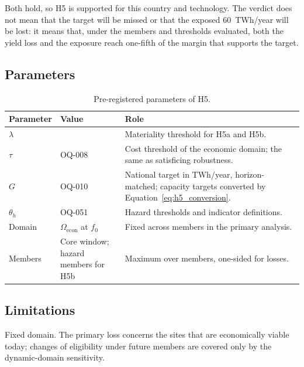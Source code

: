 Both hold, so H5 is supported for this country and technology. The verdict does
not mean that the target will be missed or that the exposed 60~TWh/year will be
lost: it means that, under the members and thresholds evaluated, both the yield
loss and the exposure reach one-fifth of the margin that supports the target.

\subsection{Parameters}
\label{subsec:h5_parameters}

\begin{table}[htbp]
    \centering
    \caption{Pre-registered parameters of H5.}
    \label{tab:h5_parameters}
    \small
    \renewcommand{\arraystretch}{1.2}
    \begin{tabularx}{\textwidth}{
        @{}
        >{\raggedright\arraybackslash}p{2.4cm}
        >{\raggedright\arraybackslash}p{3.2cm}
        >{\raggedright\arraybackslash}X
        @{}
    }
        \toprule
        \textbf{Parameter} & \textbf{Value} & \textbf{Role} \\
        \midrule
        $\lambda$ & 0.20 & Materiality threshold for H5a and H5b. \\
        \addlinespace
        $\tau$ & OQ-008 & Cost threshold of the economic domain; the same as
        satisficing robustness. \\
        \addlinespace
        $G$ & OQ-010 & National target in TWh/year, horizon-matched; capacity
        targets converted by Equation~\ref{eq:h5_conversion}. \\
        \addlinespace
        $\theta_h$ & OQ-051 & Hazard thresholds and indicator definitions. \\
        \addlinespace
        Domain & $\Omega_{\mathrm{econ}}$ at $f_0$ & Fixed across members in the
        primary analysis. \\
        \addlinespace
        Members & Core window; hazard members for H5b & Maximum over members,
        one-sided for losses. \\
        \bottomrule
    \end{tabularx}
\end{table}

\subsection{Limitations}
\label{subsec:h5_limitations}

Fixed domain. The primary loss concerns the sites that are economically viable
today; changes of eligibility under future members are covered only by the
dynamic-domain sensitivity.

